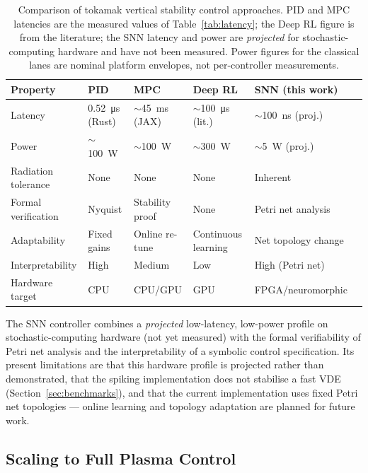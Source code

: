 \documentclass[12pt]{article}
\begin{document}
\begin{table}[htbp]
\centering
\caption{Comparison of tokamak vertical stability control approaches.  PID and
MPC latencies are the measured values of Table~\ref{tab:latency}; the Deep RL
figure is from the literature; the SNN latency and power are \emph{projected}
for stochastic-computing hardware and have not been measured.  Power figures for
the classical lanes are nominal platform envelopes, not per-controller
measurements.}
\label{tab:approach-comparison}
\begin{tabular}{p{2.5cm}p{2cm}p{2cm}p{2cm}p{2cm}p{2cm}}
\toprule
Property & PID & MPC & Deep RL~\citep{Degrave2022} & SNN (this work) \\
\midrule
Latency & \SI{0.52}{\micro\second} (Rust) & $\sim$\SI{45}{\milli\second} (JAX) &
  $\sim$\SI{100}{\micro\second} (lit.) & $\sim$\SI{100}{\nano\second} (proj.) \\
Power & $\sim$\SI{100}{\watt} & $\sim$\SI{100}{\watt} & $\sim$\SI{300}{\watt} &
  $\sim$\SI{5}{\watt} (proj.) \\
Radiation tolerance & None & None & None & Inherent \\
Formal verification & Nyquist & Stability proof & None &
  Petri net analysis \\
Adaptability & Fixed gains & Online re-tune & Continuous learning &
  Net topology change \\
Interpretability & High & Medium & Low & High (Petri net) \\
Hardware target & CPU & CPU/GPU & GPU & FPGA/neuromorphic \\
\bottomrule
\end{tabular}
\end{table}

The SNN controller combines a \emph{projected} low-latency, low-power profile on
stochastic-computing hardware (not yet measured) with the formal verifiability of
Petri net analysis and the interpretability of a symbolic control
specification.  Its present limitations are that this hardware profile is
projected rather than demonstrated, that the spiking implementation does not
stabilise a fast VDE (Section~\ref{sec:benchmarks}), and that the current
implementation uses fixed Petri net topologies --- online learning and topology
adaptation are planned for future work.

\subsection{Scaling to Full Plasma Control}
\end{document}
